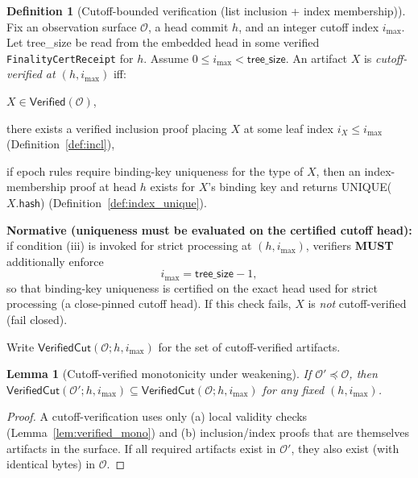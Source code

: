 \documentclass[11pt]{article}
\newcommand{\MUST}{\textbf{MUST}}
\newcommand{\code}[1]{\texttt{#1}}
\newcommand{\term}[1]{\emph{#1}}
\newcommand{\1}{\mathbf{1}}
\theoremstyle{definition}
\newtheorem{definition}{Definition}
\theoremstyle{plain}
\newtheorem{lemma}{Lemma}
\begin{document}
\begin{definition}[Cutoff-bounded verification (list inclusion + index membership)]
\label{def:cutoff_verified}
Fix an observation surface $\mathcal{O}$, a head commit $h$, and an integer cutoff index $i_{\max}$.
Let \textsf{tree\_size} be read from the embedded head in some verified \code{FinalityCertReceipt} for $h$.
Assume $0\le i_{\max}<\textsf{tree\_size}$.
An artifact $X$ is \term{cutoff-verified at $(h,i_{\max})$} iff:
\begin{tightitemize}
\item[(i)] $X\in\mathsf{Verified}(\mathcal{O})$,
\item[(ii)] there exists a verified inclusion proof placing $X$ at some leaf index $i_X\le i_{\max}$ (Definition~\ref{def:incl}),
\item[(iii)] if epoch rules require binding-key uniqueness for the type of $X$, then an index-membership proof at head $h$ exists for $X$'s binding key and returns \textsf{UNIQUE}($X.\textsf{hash}$) (Definition~\ref{def:index_unique}).
\end{tightitemize}

\textbf{Normative (uniqueness must be evaluated on the certified cutoff head):}
if condition (iii) is invoked for strict processing at $(h,i_{\max})$, verifiers \MUST{} additionally enforce
\[
i_{\max}=\textsf{tree\_size}-1,
\]
so that binding-key uniqueness is certified on the exact head used for strict processing (a close-pinned cutoff head).
If this check fails, $X$ is \emph{not} cutoff-verified (fail closed).

Write $\mathsf{VerifiedCut}(\mathcal{O};h,i_{\max})$ for the set of cutoff-verified artifacts.
\end{definition}


\begin{lemma}[Cutoff-verified monotonicity under weakening]
\label{lem:verifiedcut_mono}
If $\mathcal{O}'\preceq\mathcal{O}$, then $\mathsf{VerifiedCut}(\mathcal{O}';h,i_{\max})\subseteq \mathsf{VerifiedCut}(\mathcal{O};h,i_{\max})$ for any fixed $(h,i_{\max})$.
\end{lemma}
\begin{proof}
A cutoff-verification uses only (a) local validity checks (Lemma~\ref{lem:verified_mono}) and (b) inclusion/index proofs that are themselves artifacts in the surface. If all required artifacts exist in $\mathcal{O}'$, they also exist (with identical bytes) in $\mathcal{O}$.
\end{proof}
\end{document}
